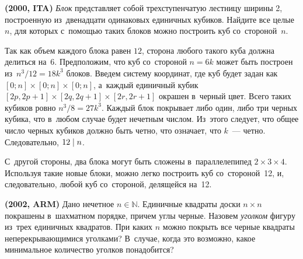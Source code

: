 \begin{problems}

\item\textbf{(2000, ITA)}
\emph{Блок} представляет собой трехступенчатую лестницу ширины 2, построенную
из~двенадцати одинаковых единичных кубиков.
Найдите все целые~$n$, для которых с~помощью таких блоков можно построить куб
со~стороной~$n$.

\end{problems}

\ifincludesolutions
Так как объем каждого блока равен $12$, сторона любого такого куба должна
делиться на~$6$.
Предположим, что куб со~стороной $n = 6 k$ может быть построен
из~$n^3 / 12 = 18 k^3$ блоков.
Введем систему координат, где куб будет задан как
$[0; n] \times [0; n] \times [0; n]$,
а~каждый единичный кубик
$[2 p, 2 p + 1] \times[2 q, 2 q + 1] \times[2 r, 2 r + 1]$ окрашен
в~черный цвет.
Всего таких кубиков ровно $n^3 / 8 = 27 k^3$.
Каждый блок покрывает либо один, либо три черных кубика, что в~любом случае
будет нечетным числом.
Из~этого следует, что общее число черных кубиков должно быть четно, что
означает, что $k$~--- четно.
Следовательно, $12 \mathrel{\vert} n$.
\par
С~другой стороны, два блока могут быть сложены в~параллелепипед
$2 \times 3 \times 4$.
Используя такие новые блоки, можно легко построить куб со~стороной~12, и,
следовательно, любой куб со~стороной, делящейся на~12.
\fi %

\begin{problems}

\item\textbf{(2002, ARM)}%
Дано нечетное $n \in \mathbb{N}$.
Единичные квадраты доски $n \times n$ покрашены в~шахматном порядке, причем
углы черные.
Назовем \emph{уголком} фигуру
из~трех единичных квадратов.
При каких $n$ можно покрыть все черные квадраты неперекрывающимися уголками?
В~случае, когда это возможно, какое минимальное количество уголков понадобится?

\end{problems}

